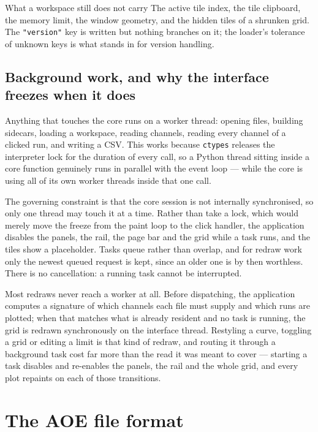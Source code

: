 \documentclass[11pt,a4paper,oneside]{report}
\newcommand{\code}[1]{\texttt{#1}}
\begin{document}
\begin{aoenote}{What a workspace still does not carry}
The active tile index, the tile clipboard, the memory limit, the window geometry,
and the hidden tiles of a shrunken grid. The \code{"version"} key is written but
nothing branches on it; the loader's tolerance of unknown keys is what stands in
for version handling.
\end{aoenote}

\section{Background work, and why the interface freezes when it does}

Anything that touches the core runs on a worker thread: opening files, building
sidecars, loading a workspace, reading channels, reading every channel of a
clicked run, and writing a CSV. This works because \code{ctypes} releases the
interpreter lock for the duration of every call, so a Python thread sitting
inside a core function genuinely runs in parallel with the event loop --- while
the core is using all of its own worker threads inside that one call.

The governing constraint is that the core session is not internally
synchronised, so only one thread may touch it at a time. Rather than take a lock,
which would merely move the freeze from the paint loop to the click handler, the
application disables the panels, the rail, the page bar and the grid while a task
runs, and the tiles show a placeholder. Tasks queue rather than overlap, and for
redraw work only the newest queued request is kept, since an older one is by then
worthless. There is no cancellation: a running task cannot be interrupted.

Most redraws never reach a worker at all. Before dispatching, the application
computes a signature of which channels each file must supply and which runs are
plotted; when that matches what is already resident and no task is running, the
grid is redrawn synchronously on the interface thread. Restyling a curve,
toggling a grid or editing a limit is that kind of redraw, and routing it through
a background task cost far more than the read it was meant to cover --- starting
a task disables and re-enables the panels, the rail and the whole grid, and every
plot repaints on each of those transitions.

\chapter{The AOE file format}
\end{document}
